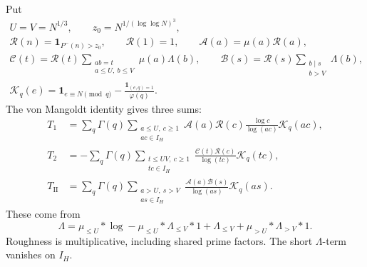 Put
\begin{equation}\label{eq:ra-rough-arrays}
\begin{gathered}
 U=V=N^{1/3},\qquad z_0=N^{1/(\log\log N)^3},\\
 \mathcal R(n)=\mathbf1_{P^-(n)>z_0},\qquad \mathcal R(1)=1,\qquad
 \mathcal A(a)=\mu(a)\mathcal R(a),\\
 \mathcal C(t)=\mathcal R(t)
       \sum_{\substack{ab=t\\a\le U,\ b\le V}}\mu(a)\Lambda(b),\qquad
 \mathcal B(s)=\mathcal R(s)\sum_{\substack{b\mid s\\b>V}}\Lambda(b),\\
 \mathcal K_q(e)=\mathbf1_{e\equiv N\pmod q}
                   -\frac{\mathbf1_{(e,q)=1}}{\varphi(q)}.
\end{gathered}
\end{equation}
The von Mangoldt identity gives three sums:
\begin{equation}\label{eq:ra-three-bilinear-sums}
\begin{aligned}
 T_1&=\sum_q\Gamma(q)
   \sum_{\substack{a\le U,\ c\ge1\\ac\in I_H}}
   \mathcal A(a)\mathcal R(c)\frac{\log c}{\log(ac)}\mathcal K_q(ac),\\
 T_2&=-\sum_q\Gamma(q)
   \sum_{\substack{t\le UV,\ c\ge1\\tc\in I_H}}
   \frac{\mathcal C(t)\mathcal R(c)}{\log(tc)}\mathcal K_q(tc),\\
 T_{\mathrm{II}}&=\sum_q\Gamma(q)
   \sum_{\substack{a>U,\ s>V\\as\in I_H}}
   \frac{\mathcal A(a)\mathcal B(s)}{\log(as)}\mathcal K_q(as).
\end{aligned}
\end{equation}
These come from
\begin{equation}\label{eq:ra-vaughan-identity}
 \Lambda=\mu_{\le U}*\log-\mu_{\le U}*\Lambda_{\le V}*1
             +\Lambda_{\le V}+\mu_{>U}*\Lambda_{>V}*1.
\end{equation}
Roughness is multiplicative, including shared prime factors.
The short \(\Lambda\)-term vanishes on \(I_H\).

